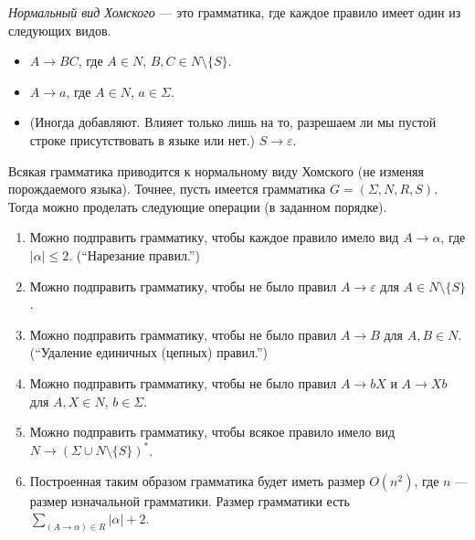 \documentclass[12pt,a4paper]{article}
\begin{document}
    \begin{definition}
        \emph{Нормальный вид Хомского} --- это грамматика, где каждое правило имеет один из следующих видов.
        \begin{itemize}
            \item $A \to BC$, где $A \in N$, $B, C \in N \setminus \{S\}$.
            \item $A \to a$, где $A \in N$, $a \in \Sigma$.
            \item (Иногда добавляют. Влияет только лишь на то, разрешаем ли мы пустой строке присутствовать в языке или нет.) $S \to \varepsilon$.
        \end{itemize}
    \end{definition}

    \begin{theorem}
        Всякая грамматика приводится к нормальному виду Хомского (не изменяя порождаемого языка). Точнее, пусть имеется грамматика $G = (\Sigma, N, R, S)$. Тогда можно проделать следующие операции (в заданном порядке).
        \begin{enumerate}
            \item Можно подправить грамматику, чтобы каждое правило имело вид $A \to \alpha$, где $|\alpha| \leqslant 2$. (``Нарезание правил.'')
            \item Можно подправить грамматику, чтобы не было правил $A \to \varepsilon$ для $A \in N \setminus \{S\}$.
            \item Можно подправить грамматику, чтобы не было правил $A \to B$ для $A, B \in N$. (``Удаление единичных (цепных) правил.'')
            \item Можно подправить грамматику, чтобы не было правил $A \to bX$ и $A \to Xb$ для $A, X \in N$, $b \in \Sigma$.
            \item Можно подправить грамматику, чтобы всякое правило имело вид $N \to (\Sigma \cup N \setminus \{S\})^*$.
            \item Построенная таким образом грамматика будет иметь размер $O(n^2)$, где $n$ --- размер изначальной грамматики. Размер грамматики есть $\sum_{(A \to \alpha) \in R} |\alpha| + 2$.
        \end{enumerate}
    \end{theorem}
\end{document}
